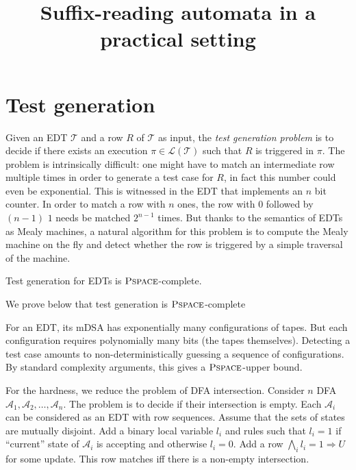 \documentclass[a4paper, 11pt]{llncs}
\newcommand{\Aa}{\mathcal{A}}
\newcommand{\Ll}{\mathcal{L}}
\newcommand{\imp}{\Rightarrow}
\newcommand{\Land}{\bigwedge}
\newcommand{\PSPACE}{\operatorname{\textsc{Pspace}}}
\newcommand{\Tt}{\mathcal{T}}
\begin{document}
\title{Suffix-reading automata in a practical setting}

\maketitle





\section{Test generation}
\label{sec:test-generation}

Given an EDT $\Tt$ and a row $R$ of $\Tt$ as input, the \emph{test
  generation problem} is to decide if there exists an execution
$\pi \in \Ll(\Tt)$ such that $R$ is triggered in $\pi$.
%
The problem is
intrinsically difficult: one might have to match an intermediate row
multiple times in order to generate a test case for $R$, in fact this
number could even be exponential. This is witnessed in the EDT that
implements an $n$ bit counter. In order to match a row with $n$ ones,
the row with $0$ followed by $(n-1)$ $1$ needs be matched $2^{n-1}$
times. 
%
But thanks to the semantics of EDTs as Mealy machines, a natural
algorithm for this problem is to compute the Mealy machine 
on the fly and detect whether the row is triggered by a simple
traversal of the machine.


\begin{theorem}
  \label{thm:test-generation-PSPACE}
  Test generation for EDTs is $\PSPACE$-complete.
\end{theorem}

We prove below that test generation is $\PSPACE$-complete

For an EDT, its mDSA has exponentially many
configurations of tapes. But each configuration requires polynomially many bits (the tapes themselves). Detecting a test
case amounts to non-deterministically guessing a sequence of configurations. By standard complexity arguments, this gives a
$\PSPACE$-upper bound. %

For the hardness, we reduce the problem of DFA
intersection. Consider $n$ DFA $\Aa_1, \Aa_2, \dots, \Aa_n$. The
problem is to decide if their intersection is empty. Each $\Aa_i$
can be considered as an EDT with row sequences. Assume that the sets
of states are mutually disjoint. Add a binary local variable $l_i$ and rules
such that $l_i = 1$ if ``current'' state of $\Aa_i$ is accepting and
otherwise $l_i = 0$. Add a row $\Land_i l_i = 1 \imp U$ for some
update. This row matches iff there is a non-empty intersection.
\end{document}
